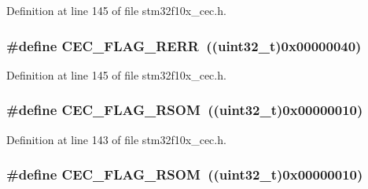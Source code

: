 Definition at line 145 of file stm32f10x\+\_\+cec.\+h.

\subsubsection[{\texorpdfstring{C\+E\+C\+\_\+\+F\+L\+A\+G\+\_\+\+R\+E\+RR}{CEC_FLAG_RERR}}]{\setlength{\rightskip}{0pt plus 5cm}\#define C\+E\+C\+\_\+\+F\+L\+A\+G\+\_\+\+R\+E\+RR~(({\bf uint32\+\_\+t})0x00000040)}\hypertarget{group___c_e_c__flags__definition_gac2376c2b958536ab414574f60cb5d75a}{}\label{group___c_e_c__flags__definition_gac2376c2b958536ab414574f60cb5d75a}


Definition at line 145 of file stm32f10x\+\_\+cec.\+h.

\subsubsection[{\texorpdfstring{C\+E\+C\+\_\+\+F\+L\+A\+G\+\_\+\+R\+S\+OM}{CEC_FLAG_RSOM}}]{\setlength{\rightskip}{0pt plus 5cm}\#define C\+E\+C\+\_\+\+F\+L\+A\+G\+\_\+\+R\+S\+OM~(({\bf uint32\+\_\+t})0x00000010)}\hypertarget{group___c_e_c__flags__definition_ga4e352d4f48e3b197edf150860703d2bf}{}\label{group___c_e_c__flags__definition_ga4e352d4f48e3b197edf150860703d2bf}


Definition at line 143 of file stm32f10x\+\_\+cec.\+h.

\subsubsection[{\texorpdfstring{C\+E\+C\+\_\+\+F\+L\+A\+G\+\_\+\+R\+S\+OM}{CEC_FLAG_RSOM}}]{\setlength{\rightskip}{0pt plus 5cm}\#define C\+E\+C\+\_\+\+F\+L\+A\+G\+\_\+\+R\+S\+OM~(({\bf uint32\+\_\+t})0x00000010)}\hypertarget{group___c_e_c__flags__definition_ga4e352d4f48e3b197edf150860703d2bf}{}\label{group___c_e_c__flags__definition_ga4e352d4f48e3b197edf150860703d2bf}


